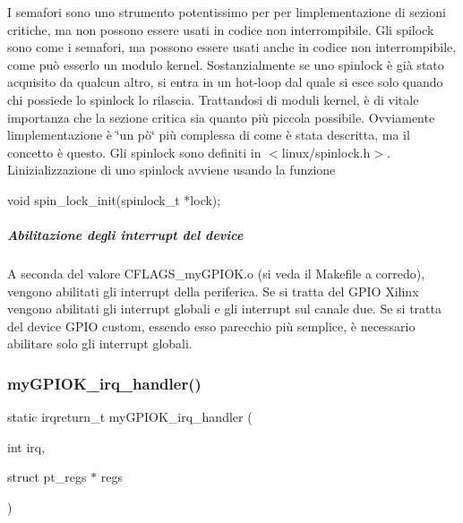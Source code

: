 I semafori sono uno strumento potentissimo per per l\textquotesingle{}implementazione di sezioni critiche, ma non possono essere usati in codice non interrompibile. Gli spilock sono come i semafori, ma possono essere usati anche in codice non interrompibile, come può esserlo un modulo kernel. Sostanzialmente se uno spinlock è già stato acquisito da qualcun altro, si entra in un hot-\/loop dal quale si esce solo quando chi possiede lo spinlock lo rilascia. Trattandosi di moduli kernel, è di vitale importanza che la sezione critica sia quanto più piccola possibile. Ovviamente l\textquotesingle{}implementazione è \char`\"{}un pò\char`\"{} più complessa di come è stata descritta, ma il concetto è questo. Gli spinlock sono definiti in $<$linux/spinlock.\+h$>$. L\textquotesingle{}inizializzazione di uno spinlock avviene usando la funzione 
\begin{DoxyCode}
\textcolor{keywordtype}{void} spin\_lock\_init(spinlock\_t *lock);
\end{DoxyCode}


\subparagraph*{Abilitazione degli interrupt del device}

A seconda del valore C\+F\+L\+A\+G\+S\+\_\+my\+G\+P\+I\+O\+K.\+o (si veda il Makefile a corredo), vengono abilitati gli interrupt della periferica. Se si tratta del G\+P\+IO Xilinx vengono abilitati gli interrupt globali e gli interrupt sul canale due. Se si tratta del device G\+P\+IO custom, essendo esso parecchio più semplice, è necessario abilitare solo gli interrupt globali.\mbox{\label{group___linux-_driver_ga2fc230a12a97aa63e43b2dc4aec73511}} 
\subsubsection{\texorpdfstring{my\+G\+P\+I\+O\+K\+\_\+irq\+\_\+handler()}{myGPIOK\_irq\_handler()}}
{\footnotesize\ttfamily static irqreturn\+\_\+t my\+G\+P\+I\+O\+K\+\_\+irq\+\_\+handler (\begin{DoxyParamCaption}\item[{int}]{irq,  }\item[{struct pt\+\_\+regs $\ast$}]{regs }\end{DoxyParamCaption})\hspace{0.3cm}{\ttfamily [static]}}



